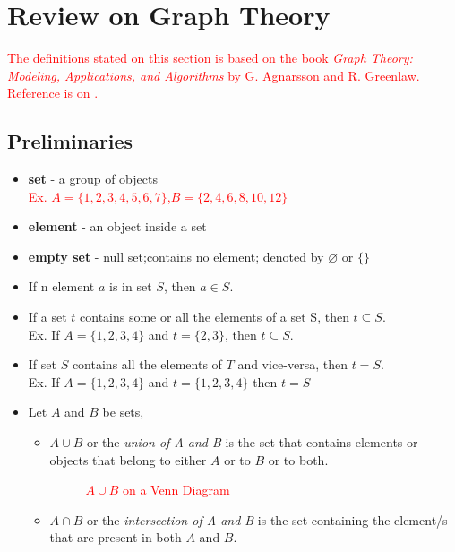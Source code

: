 \section{Review on Graph Theory  }
\textcolor{red}{The definitions stated on this section is based on the book \textit{Graph Theory: Modeling, Applications, and Algorithms} by G. Agnarsson and R. Greenlaw. Reference is on \cite{agnarsson2006graph}.}

\subsection{Preliminaries}
\begin{itemize}
\item \textbf{set} - a group of objects\\
\textcolor{red}{Ex. $A=\{1,2,3,4,5,6,7\}$,$B=\{2,4,6,8,10,12\}$ }
\item \textbf{element} - an object inside a set
\item \textbf{empty set} - null set;contains no element; denoted by $\varnothing$ or $\{\}$
\item If n element $a$ is in set $S$, then $a \in S $.
\item If a set $t$ contains some or all the elements of a set S, then $t \subseteq S$.\\
Ex. If $A=\{1,2,3,4\}$ and $t=\{2,3\}$, then $t \subseteq S$.
\item If set $S$ contains all the elements of $T$ and vice-versa, then $t=S$.\\
Ex. If $A=\{1,2,3,4\}$ and $t=\{1,2,3,4\}$ then $t=S$
\item Let $A$ and $B$ be sets,
\begin{itemize}
	\item $A \cup B$ or the \textit{union of A and B} is the set that contains elements or objects that belong to either $A$ or to $B$ or to both.
	\begin{figure}[h]
	\centering
\caption{\textcolor{red}{$A \cup B$ on a Venn Diagram}}
	\end{figure}
	\item $A \cap B$ or the \textit{intersection of A and B} is the set containing the element/s that are present in both $A$ and $B$.

\end{itemize}
\end{itemize}
